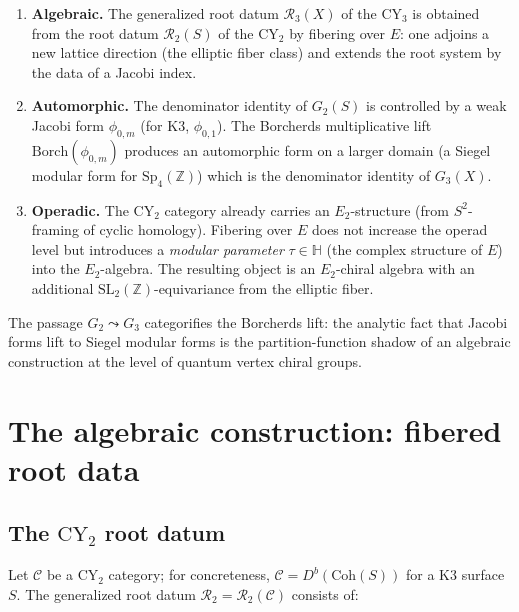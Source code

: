 \documentclass[11pt]{article}
\theoremstyle{plain}
\theoremstyle{definition}
\theoremstyle{remark}
\newcommand{\CY}{\mathrm{CY}}
\newcommand{\Coh}{\mathrm{Coh}}
\newcommand{\Etwo}{E_2}
\newcommand{\cC}{\mathcal{C}}
\newcommand{\cR}{\mathcal{R}}
\begin{document}
\begin{enumerate}[label=(\alph*)]
\item \textbf{Algebraic.} The generalized root datum $\cR_3(X)$ of the $\CY_3$
 is obtained from the root datum $\cR_2(S)$ of the $\CY_2$ by fibering over
 $E$: one adjoins a new lattice direction (the elliptic fiber class) and
 extends the root system by the data of a Jacobi index.

\item \textbf{Automorphic.} The denominator identity of $G_2(S)$ is controlled
 by a weak Jacobi form $\phi_{0,m}$ (for K3, $\phi_{0,1}$). The Borcherds
 multiplicative lift $\mathrm{Borch}(\phi_{0,m})$ produces an automorphic form
 on a larger domain (a Siegel modular form for $\mathrm{Sp}_4(\mathbb{Z})$)
 which is the denominator identity of $G_3(X)$.

\item \textbf{Operadic.} The $\CY_2$ category already carries an
 $\Etwo$-structure (from $S^2$-framing of cyclic homology). Fibering over $E$
 does not increase the operad level but introduces a \emph{modular parameter}
 $\tau \in \mathbb{H}$ (the complex structure of $E$) into the $\Etwo$-algebra.
 The resulting object is an $\Etwo$-chiral algebra with an additional
 $\mathrm{SL}_2(\mathbb{Z})$-equivariance from the elliptic fiber.
\end{enumerate}

The passage $G_2 \leadsto G_3$ categorifies the Borcherds lift:
the analytic fact that Jacobi forms lift to Siegel modular forms is the partition-function shadow of an algebraic construction at the level of quantum vertex chiral groups.

\section{The algebraic construction: fibered root data}
\label{sec:fib-algebraic}

\subsection{The $\CY_2$ root datum}
\label{subsec:cy2-root-datum}

Let $\cC$ be a $\CY_2$ category; for concreteness, $\cC = D^b(\Coh(S))$ for
a K3 surface $S$. The generalized root datum $\cR_2 = \cR_2(\cC)$ consists of:
\end{document}

